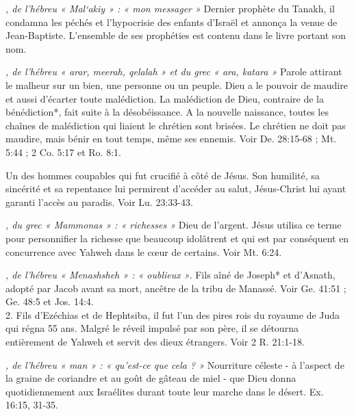 \begin{multicols}{2}
\textit{, de l'hébreu « Mal`akiy » : « mon messager »}\newline
Dernier prophète du Tanakh, il condamna les péchés et l'hypocrisie des enfants d'Israël et annonça la venue de Jean-Baptiste. L'ensemble de ses prophéties est contenu dans le livre portant son nom.

\textit{, de l'hébreu « arar, meerah, qelalah » et du grec « ara, katara »}\newline
Parole attirant le malheur sur un bien, une personne ou un peuple. Dieu a le pouvoir de maudire et aussi d'écarter toute malédiction. La malédiction de Dieu, contraire de la bénédiction*, fait suite à la désobéissance. A la nouvelle naissance, toutes les chaînes de malédiction qui liaient le chrétien sont brisées. Le chrétien ne doit pas maudire, mais bénir en tout temps, même ses ennemis. Voir De. 28:15-68 ; Mt. 5:44 ; 2 Co. 5:17 et Ro. 8:1.

\textit{}\newline
Un des hommes coupables qui fut crucifié à côté de Jésus. Son humilité, sa sincérité et sa repentance lui permirent d'accéder au salut, Jésus-Christ lui ayant garanti l'accès au paradis. Voir Lu. 23:33-43.

\textit{, du grec « Mammonas » : « richesses »}\newline
Dieu de l'argent. Jésus utilisa ce terme pour personnifier la richesse que beaucoup idolâtrent et qui est par conséquent en concurrence avec Yahweh dans le cœur de certains. Voir Mt. 6:24.

\textit{, de l'hébreu « Menashsheh » : « oublieux »}. Fils aîné de Joseph* et d'Asnath, adopté par Jacob avant sa mort, ancêtre de la tribu de Manassé. Voir Ge. 41:51 ; Ge. 48:5 et Jos. 14:4.
\\2. Fils d'Ezéchias et de Hephtsiba, il fut l'un des pires rois du royaume de Juda qui régna 55 ans. Malgré le réveil impulsé par son père, il se détourna entièrement de Yahweh et servit des dieux étrangers. Voir 2 R. 21:1-18.

\textit{, de l'hébreu « man » : « qu'est-ce que cela ? »}\newline
Nourriture céleste - à l'aspect de la graine de coriandre et au goût de gâteau de miel - que Dieu donna quotidiennement aux Israélites durant toute leur marche dans le désert. Ex. 16:15, 31-35.


\end{multicols}
